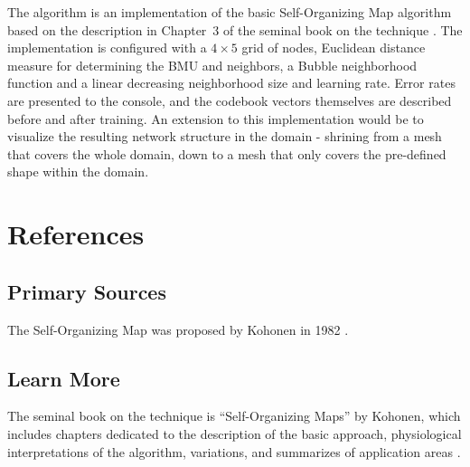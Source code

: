 \documentclass[a4paper, 11pt]{article}
\begin{document}
The algorithm is an implementation of the basic Self-Organizing Map algorithm based on the description in Chapter~3 of the seminal book on the technique \cite{Kohonen1995}. The implementation is configured with a $4 \times 5$ grid of nodes, Euclidean distance measure for determining the BMU and neighbors, a Bubble neighborhood function and a linear decreasing neighborhood size and learning rate. Error rates are presented to the console, and the codebook vectors themselves are described before and after training. An extension to this implementation would be to visualize the resulting network structure in the domain - shrining from a mesh that covers the whole domain, down to a mesh that only covers the pre-defined shape within the domain.




\section{References}
\label{sec:references}

% 
% 
\subsection{Primary Sources}
The Self-Organizing Map was proposed by Kohonen in 1982 \cite{Kohonen1982}.

% 
% 
\subsection{Learn More}
The seminal book on the technique is ``Self-Organizing Maps'' by Kohonen, which includes chapters dedicated to the description of the basic approach, physiological interpretations of the algorithm, variations, and summarizes of application areas \cite{Kohonen1995}.
\end{document}
